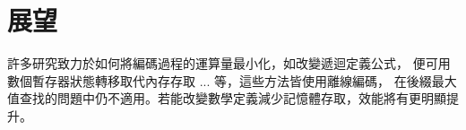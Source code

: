 \section{展望}
\label{sec:Feature}

許多研究致力於如何將編碼過程的運算量最小化，如改變遞迴定義公式，
便可用數個暫存器狀態轉移取代內存存取 ... 等，這些方法皆使用離線編碼，
在後綴最大值查找的問題中仍不適用。若能改變數學定義減少記憶體存取，效能將有更明顯提升。